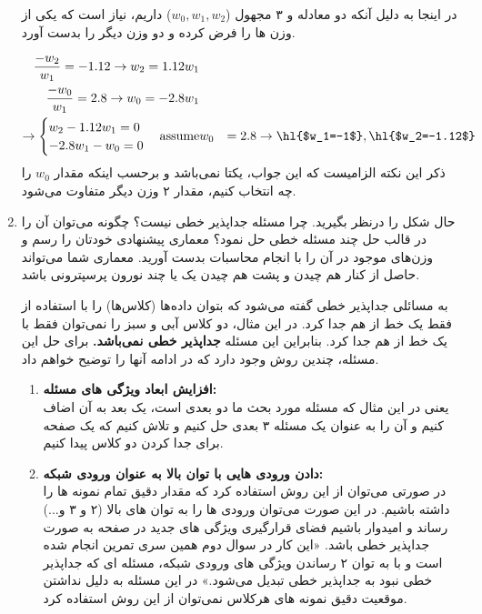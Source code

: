 \begin{enumerate}
\begin{qsolve}
		
		در اینجا به دلیل آنکه دو معادله و ۳ مجهول ($w_0,w_1,w_2$) داریم، نیاز است که یکی از وزن ها را فرض کرده و دو وزن دیگر را بدست آورد.
		
		\begin{eqnarray*}
			\frac{-w_2}{w_1}=-1.12 \rightarrow w_2=1.12w_1\\
			\frac{-w_0}{w_1}=2.8 \rightarrow w_0=-2.8w_1\\
			\rightarrow
			\begin{cases}
				w_2-1.12w_1=0\\
				-2.8w_1-w_0=0 
			\end{cases}
			\text{assume} &w_0&=2.8 \rightarrow \text{\hl{$w_1=-1$}}, \text{\hl{$w_2=-1.12$}}
		\end{eqnarray*}
		ذکر این نکته الزامیست که این جواب، یکتا نمی‌باشد و برحسب اینکه مقدار $w_0$ را چه انتخاب کنیم، مقدار ۲ وزن دیگر متفاوت می‌شود.
	\end{qsolve}
	
	

	
	\item حال شکل  را درنظر بگیرید. چرا مسئله جداپذیر خطی نیست؟ چگونه می‌توان آن را در قالب حل چند مسئله خطی حل نمود؟ معماری پیشنهادی خودتان را رسم و وزن‌های موجود در آن را با انجام محاسبات بدست آورید. معماری شما می‌تواند حاصل از کنار هم چیدن و پشت هم چیدن یک یا چند نورون پرسپترونی باشد.
	
	
	
	\begin{qsolve}
		به مسائلی جداپذیر خطی گفته می‌شود که بتوان داده‌ها (کلاس‌ها) را با استفاده از فقط یک خط از هم جدا کرد. در این مثال، دو کلاس آبی و سبز را نمی‌توان فقط با یک خط از هم جدا کرد. بنابراین این مسئله \textbf{جداپذیر خطی نمی‌باشد.} برای حل این مسئله، چندین روش وجود دارد که در ادامه آنها را توضیح خواهم داد.
		
		\begin{enumerate}
			\item \textbf{افزایش ابعاد ویژگی های مسئله: }\\
			یعنی در این مثال که مسئله مورد بحث ما دو بعدی است، یک بعد به آن اضاف کنیم و آن را به عنوان یک مسئله ۳ بعدی حل کنیم و تلاش کنیم که یک صفحه برای جدا کردن دو کلاس پیدا کنیم.
			
			\item \textbf{دادن ورودی هایی با توان بالا به عنوان ورودی شبکه: }\\
			در صورتی می‌توان از این روش استفاده کرد که مقدار دقیق تمام نمونه ها را داشته باشیم. در این صورت می‌توان ورودی ها را به توان های بالا (۲ و ۳ و...) رساند و امیدوار باشیم فضای قرارگیری ویژگی های جدید در صفحه به صورت جداپذیر خطی باشد. «این کار در سوال دوم همین سری تمرین انجام شده است و با به توان ۲ رساندن ویژگی های ورودی شبکه، مسئله ای که جداپذیر خطی نبود به جداپذیر خطی تبدیل می‌شود.» در این مسئله به دلیل نداشتن موقعیت دقیق نمونه های هرکلاس نمی‌توان از این روش استفاده کرد.
			

\end{enumerate}
\end{qsolve}
\end{enumerate}
